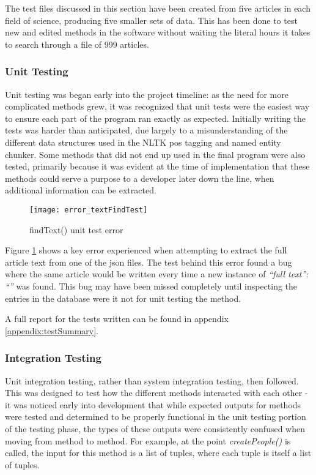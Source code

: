 \documentclass[11pt,a4paper]{book}
\begin{document}
The test files discussed in this section have been created from five articles in each field of science, producing five smaller sets of data. This has been done to test new and edited methods in the software without waiting the literal hours it takes to search through a file of 999 articles.

\subsubsection{Unit Testing}
Unit testing was began early into the project timeline: as the need for more complicated methods grew, it was recognized that unit tests were the easiest way to ensure each part of the program ran exactly as expected. %
Initially writing the tests was harder than anticipated, due largely to a misunderstanding of the different data structures used in the NLTK pos tagging and named entity chunker. Some methods that did not end up used in the final program were also tested, primarily because it was evident at the time of implementation that these methods could serve a purpose to a developer later down the line, when additional information can be extracted. 
\begin{figure}[H]
	\centering
	\texttt{[image: error\_textFindTest]}
	\caption{findText() unit test error}
	\label{fig:ute1}
\end{figure}
Figure \ref{fig:ute1} shows a key error experienced when attempting to extract the full article text from one of the json files. The test behind this error found a bug where the same article would be written every time a new instance of \textit{``full text'': ``''} was found. This bug may have been missed completely until inspecting the entries in the database were it not for unit testing the method. 

A full report for the tests written can be found in appendix \ref{appendix:testSummary}.

\subsubsection{Integration Testing}
Unit integration testing, rather than system integration testing, then followed. This was designed to test how the different methods interacted with each other - it was noticed early into development that while expected outputs for methods were tested and determined to be properly functional in the unit testing portion of the testing phase, the types of these outputs were consistently confused when moving from method to method. For example, at the point \textit{createPeople()} is called, the input for this method is a list of tuples, where each tuple is itself a list of tuples. 
\end{document}
